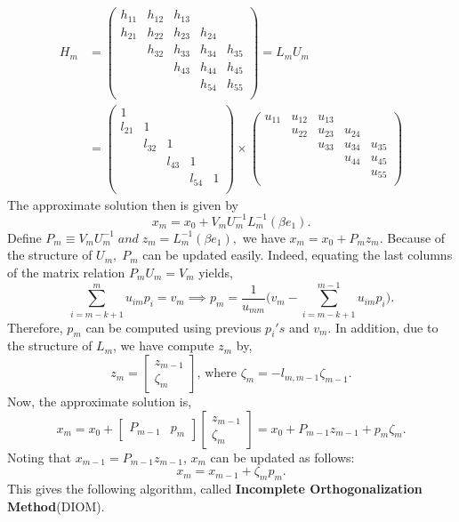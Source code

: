 \documentclass[10pt,a4paper]{article}
\begin{document}
\begin{align*}
H_m &= \left( \begin{array}{ccccc}
h_{11} & h_{12} & h_{13} &  &  \\
h_{21} & h_{22} & h_{23} & h_{24} &  \\
 & h_{32} & h_{33} & h_{34} & h_{35} \\
 &  & h_{43} & h_{44} & h_{45} \\
 &  &  & h_{54} & h_{55} \\
\end{array} \right) = L_mU_m \\
&= \left( \begin{array}{ccccc}
1 &  &  &  &  \\
l_{21} & 1 &  &  &  \\
 & l_{32} & 1 &  &  \\
 &  & l_{43} & 1 &  \\
 &  &  & l_{54} & 1 \\
\end{array} \right)\times 
\left( \begin{array}{ccccc}
u_{11} & u_{12} & u_{13} &  &  \\
 & u_{22} & u_{23} & u_{24} &  \\
 &  & u_{33} & u_{34} & u_{35} \\
 &  &  & u_{44} & u_{45} \\
 &  &  &  & u_{55} \\
\end{array} \right) 
\end{align*}
The approximate solution then is given by 
$$x_m=x_0+V_mU^{-1}_mL^{-1}_m(\beta e_1).$$
Define $P_m\equiv V_mU^{-1}_m\;and\;z_m=L^{-1}_m(\beta e_1),$ we have $x_m=x_0+P_mz_m.$ Because of the structure of $U_m,\;P_m$ can be updated easily. Indeed, equating the last columns of the matrix relation $P_mU_m=V_m$ yields,
$$\sum^m_{i=m-k+1} u_{im}p_i=v_m\implies p_m = \frac{1}{u_{mm}}\Bigg( v_m-\sum^{m-1}_{i=m-k+1}u_{im}p_i \Bigg).$$
Therefore, $p_m$ can be computed using previous $p_i's$ and $v_m$. In addition, due to the structure of $L_m$, we have compute $z_m$ by,
$$z_m=\left[ \begin{array}{c} z_{m-1} \\ \zeta_m \end{array} \right]\text{, where }\zeta_m=-l_{m,m-1}\zeta_{m-1}.$$
Now, the approximate solution is,
$$x_m=x_0+\left[ \begin{array}{cc} P_{m-1} & p_m \end{array} \right]\left[ \begin{array}{c} z_{m-1} \\ \zeta_m \end{array} \right]=x_0+P_{m-1}z_{m-1}+p_m\zeta_m.$$
Noting that $x_{m-1}=P_{m-1}z_{m-1}$, $x_m$ can be updated as follows:
$$x_m=x_{m-1}+\zeta_mp_m.$$
This gives the following algorithm, called \textbf{Incomplete Orthogonalization Method}(DIOM).
\end{document}
